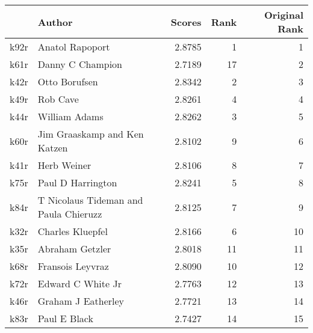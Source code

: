 \begin{tabular}{llrrr}
\toprule
{} &                                 Author &  Scores &  Rank &  Original Rank \\
\midrule
k92r &                        Anatol Rapoport &  2.8785 &     1 &              1 \\
k61r &                       Danny C Champion &  2.7189 &    17 &              2 \\
k42r &                          Otto Borufsen &  2.8342 &     2 &              3 \\
k49r &                               Rob Cave &  2.8261 &     4 &              4 \\
k44r &                          William Adams &  2.8262 &     3 &              5 \\
k60r &           Jim Graaskamp and Ken Katzen &  2.8102 &     9 &              6 \\
k41r &                            Herb Weiner &  2.8106 &     8 &              7 \\
k75r &                      Paul D Harrington &  2.8241 &     5 &              8 \\
k84r &  T Nicolaus Tideman and Paula Chieruzz &  2.8125 &     7 &              9 \\
k32r &                       Charles Kluepfel &  2.8166 &     6 &             10 \\
k35r &                        Abraham Getzler &  2.8018 &    11 &             11 \\
k68r &                       Fransois Leyvraz &  2.8090 &    10 &             12 \\
k72r &                      Edward C White Jr &  2.7763 &    12 &             13 \\
k46r &                     Graham J Eatherley &  2.7721 &    13 &             14 \\
k83r &                           Paul E Black &  2.7427 &    14 &             15 \\
\bottomrule
\end{tabular}
